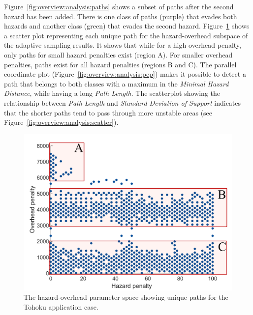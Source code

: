 \documentclass{egpubl}
\begin{document}
Figure~\ref{fig:overview:analysis:paths} shows a subset of paths after the second hazard has been added. There is one class of paths (purple) that evades both hazards and another class (green) that evades the second hazard. Figure~\ref{fig:sampling:tohoku} shows a scatter plot representing each unique path for the hazard-overhead subspace of the adaptive sampling results. It shows that while for a high overhead penalty, only paths for small hazard penalties exist (region A). For smaller overhead penalties, paths exist for all hazard penalties (regions B and C). The parallel coordinate plot (Figure~\ref{fig:overview:analysis:pcp}) makes it possible to detect a path that belongs to both classes with a maximum in the \emph{Minimal Hazard Distance}, while having a long \emph{Path Length}. The scatterplot showing the relationship between \emph{Path Length} and \emph{Standard Deviation of Support} indicates that the shorter paths tend to pass through more unstable areas (see Figure~\ref{fig:overview:analysis:scatter}).

\begin{figure}
	\newcommand{\abImageComparisonWidth}{0.7\linewidth}
	\centering
		\includegraphics[width=\abImageComparisonWidth]{figures/adaptive_sampling_tohoku.png}
	\caption{The hazard-overhead parameter space showing unique paths for the Tohoku application case.}
	\label{fig:sampling:tohoku}
\end{figure}

\end{document}
